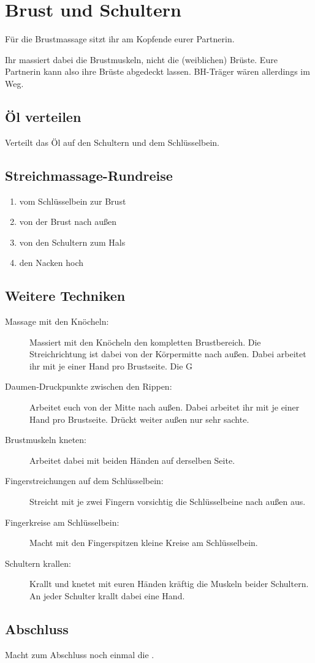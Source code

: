 \section{Brust und Schultern}

Für die Brustmassage sitzt ihr am Kopfende eurer Partnerin.

Ihr massiert dabei die Brustmuskeln, nicht die (weiblichen) Brüste. Eure Partnerin kann also ihre Brüste abgedeckt lassen. BH-Träger wären allerdings im Weg.

\subsection{Öl verteilen}
Verteilt das Öl auf den Schultern und dem Schlüsselbein.

\subsection{Streichmassage-Rundreise}

\begin{oframed}
  \begin{enumerate}
    \item vom Schlüsselbein zur Brust
    \item von der Brust nach außen
    \item von den Schultern zum Hals
    \item den Nacken hoch
  \end{enumerate}
\end{oframed}

\subsection{Weitere Techniken}
\begin{description}
  \item [Massage mit den Knöcheln:] Massiert mit den Knöcheln den kompletten Brustbereich. Die Streichrichtung ist dabei von der Körpermitte nach außen. Dabei arbeitet ihr mit je einer Hand pro Brustseite. Die G
  \item [Daumen-Druckpunkte zwischen den Rippen:] Arbeitet euch von der Mitte nach außen. Dabei arbeitet ihr mit je einer Hand pro Brustseite. Drückt weiter außen nur sehr sachte.
  \item [Brustmuskeln kneten:] Arbeitet dabei mit beiden Händen auf derselben Seite.
  \item [Fingerstreichungen auf dem Schlüsselbein:] Streicht mit je zwei Fingern vorsichtig die Schlüsselbeine nach außen aus.
  \item [Fingerkreise am Schlüsselbein:] Macht mit den Fingerspitzen kleine Kreise am Schlüsselbein.
  \item [Schultern krallen:] Krallt und knetet mit euren Händen kräftig die Muskeln beider Schultern. An jeder Schulter krallt dabei eine Hand.
\end{description}

\subsection{Abschluss}

Macht zum Abschluss noch einmal die .
